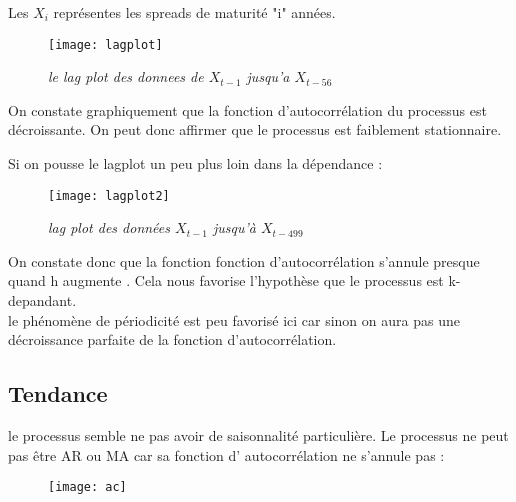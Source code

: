 Les $X_i$ représentes les spreads de maturité "i" années.
\begin{figure}[H] 
	\begin{center} 
		\texttt{[image: lagplot]} 
	\end{center} 
	\caption{\it le lag plot des donnees de $X_{t-1}$ jusqu'a $X_{t-56}$} 
	\label{fig:lagplot} 
\end{figure}

On constate graphiquement que la fonction d'autocorrélation du processus est décroissante. On peut donc affirmer
que le processus est faiblement stationnaire.

Si on pousse le lagplot un peu plus loin dans la dépendance :
\begin{figure}[H] 
	\begin{center} 
		\texttt{[image: lagplot2]}
	\end{center} 
	\caption{\it lag plot des données $X_{t-1}$ jusqu'à $X_{t-499}$} 
	\label{fig:lagplot2}
\end{figure}

On constate donc que la fonction fonction d'autocorrélation s'annule presque quand h augmente
. Cela nous favorise l'hypothèse que le processus est k-depandant. \\
le phénomène de périodicité est peu favorisé ici car sinon on aura pas une décroissance parfaite de 
la fonction d'autocorrélation.

\subsection{Tendance}
le processus semble ne pas avoir de saisonnalité particulière.
Le processus ne peut pas être AR ou MA car sa fonction d' autocorrélation ne s'annule pas :
\begin{figure}[H]
	\begin{center}
		\texttt{[image: ac]} 
	\end{center}
	\caption{}
	\label{fig:cor}
\end{figure}

